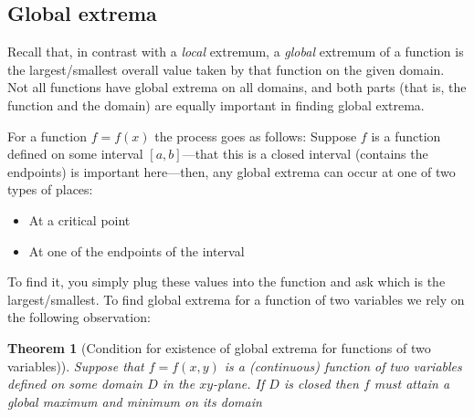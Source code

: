 \documentclass[12pt]{article}
\numberwithin{equation}{subsection}
\numberwithin{figure}{subsection}
\newtheorem{thm}[subsection]{Theorem}
\theoremstyle{note}
\begin{document}
{\subsection{Global extrema}

Recall that, in contrast with a \textit{local} extremum, a \textit{global} extremum of a function is the largest/smallest overall value taken by that function on the given domain. Not all functions have global extrema on all domains, and both parts (that is, the function and the domain) are equally important in finding global extrema. 

For a function $f=f(x)$ the process goes as follows: Suppose $f$ is a function defined on some interval $[a,b]$---that this is a closed interval (contains the endpoints) is important here---then, any global extrema can occur at one of two types of places:
\begin{itemize}
	\item At a critical point
	\item At one of the endpoints of the interval
\end{itemize}

To find it, you simply plug these values into the function and ask which is the largest/smallest. To find global extrema for a function of two variables we rely on the following observation:

\begin{thm}[Condition for existence of global extrema for functions of two variables)]Suppose that $f=f(x,y)$ is a (continuous) function of two variables defined on some domain $D$ in the $xy$-plane. If $D$ is \textit{closed} then $f$ must attain a global maximum and minimum on its domain
\end{thm}

}
\end{document}
